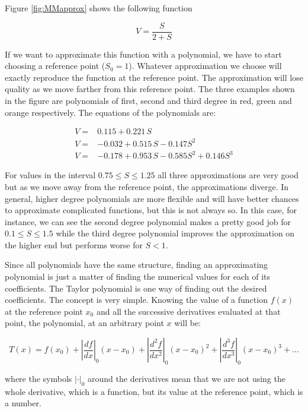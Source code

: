 \documentclass{tufte-book} %
\begin{document}
Figure \ref{fig:MMapprox} shows the following function

\begin{equation}
	V=\frac{S}{2+S} \nonumber
\end{equation}

If we want to approximate this function with a polynomial, we have to start choosing a reference point ($S_0=1$). Whatever approximation we choose will exactly reproduce the function at the reference point. The approximation will lose quality as we move farther from this reference point. The three examples shown in the figure are polynomials of first, second and third degree in red, green and orange respectively. The  equations of the polynomials are:

\begin{align}
	V=& 0.115 + 0.221 \, S\nonumber\\
	V=& -0.032 + 0.515 \, S - 0.147 S^2\nonumber\\
	V=& -0.178 + 0.953 \, S- 0.585 S^2+ 0.146 S^3 \nonumber
\end{align}

For values in the interval $0.75 \leq S \leq 1.25$ all three approximations are very good but as we move away from the reference point, the approximations diverge. In general, higher degree polynomials are more flexible and will have better chances to approximate complicated functions, but this is not always so. In this case, for instance, we can see the second degree polynomial makes a pretty good job for $0.1 \leq S \leq 1.5$ while the third degree polynomial improves the approximation on the higher end but performs worse for $S < 1$.

Since all polynomials have the same structure, finding an approximating polynomial is just a matter of finding the numerical values for each of its coefficients. The Taylor polynomial is one way of finding out the desired coefficients. The concept is very simple. Knowing the value of a function $f(x)$ at the reference point $x_0$ and all the successive derivatives evaluated at that point, the polynomial, at an arbitrary point $x$ will be:

\begin{equation}
	T(x)=f(x_0) + \left|\frac{df}{dx}\right|_0 \left( x - x_0\right)+ \left|\frac{d^2f}{dx^2}\right|_0 \left( x - x_0\right)^2+ \left|\frac{d^3f}{dx^3}\right|_0 \left( x - x_0\right)^3+ \dots
	\nonumber
\end{equation}

where the symbols $\left| \cdot \right|_0$ around the derivatives mean that we are not using the whole derivative, which is a function, but its value at the reference point, which is a number.
\end{document}
